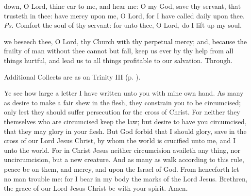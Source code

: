 
\introit
{} down, O Lord, thine ear to me, and hear me: O my God, save thy servant, that trusteth in thee: have mercy upon me, O Lord, for I have called daily upon thee. \textit{Ps.} Comfort the soul of thy servant: for unto thee, O Lord, do I lift up my soul.

\collect
{} we beseech thee, O Lord, thy Church with thy perpetual mercy; and, because the frailty of man without thee cannot but fall, keep us ever by thy help from all things hurtful, and lead us to all things profitable to our salvation. Through.
\begin{rubric}
    Additional Collects are as on Trinity III (p. \pageref{TrinityIII}).
\end{rubric}

 Ye see how large a letter I have written unto you with mine own hand. As many as desire to make a fair shew in the flesh, they constrain you to be circumcised; only lest they should suffer persecution for the cross of Christ. For neither they themselves who are circumcised keep the law; but desire to have you circumcised, that they may glory in your flesh. But God forbid that I should glory, save in the cross of our Lord Jesus Christ, by whom the world is crucified unto me, and I unto the world. For in Christ Jesus neither circumcision availeth any thing, nor uncircumcision, but a new creature. And as many as walk according to this rule, peace be on them, and mercy, and upon the Israel of God. From henceforth let no man trouble me: for I bear in my body the marks of the Lord Jesus. Brethren, the grace of our Lord Jesus Christ be with your spirit. Amen.


